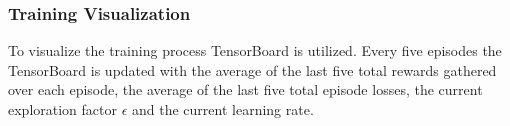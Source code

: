 \subsubsection{Training Visualization}
\label{ch:approachBh}

To visualize the training process TensorBoard is utilized. Every five episodes the TensorBoard is updated with the average of the last five total rewards gathered over each episode, the average of the last five total episode losses, the current exploration factor $\epsilon$ and the current learning rate. 

\newpage
